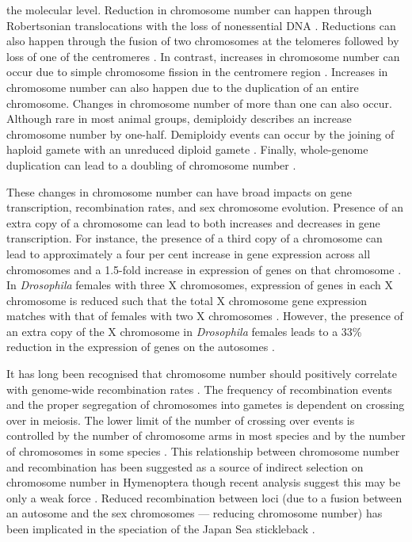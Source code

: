 \documentclass[]{rsos}%
\begin{document}
\maketitle

the molecular level.
Reduction in chromosome number can happen through Robertsonian translocations with the loss of nonessential DNA \cite{garagna1995}.
Reductions can also happen through the fusion of two chromosomes at the telomeres followed by loss of one of the centromeres \cite{gordon2011mechanisms, miga2016}.
In contrast, increases in chromosome number can occur due to simple chromosome fission in the centromere region \cite{moretti1984}.
Increases in chromosome number can also happen due to the duplication of an entire chromosome.
Changes in chromosome number of more than one can also occur.
Although rare in most animal groups, demiploidy describes an increase chromosome number by one-half. 
Demiploidy events can occur by the joining of haploid gamete with an unreduced diploid gamete \cite{hornsey1973}.
Finally, whole-genome duplication can lead to a doubling of chromosome number \cite{beccak1970}.

These changes in chromosome number can have broad impacts on gene transcription, recombination rates, and sex chromosome evolution.
Presence of an extra copy of a chromosome can lead to both increases and decreases in gene transcription.  
For instance, the presence of a third copy of a chromosome can lead to approximately a four per cent increase in gene expression across all chromosomes and a 1.5-fold increase in expression of genes on that chromosome \cite{lockstone2007, williams2008aneuploidy}.
In \textit{Drosophila} females with three X chromosomes, expression of genes in each X chromosome is reduced such that the total X chromosome gene expression matches with that of females with two X chromosomes \cite{sun2013dosage}.
However, the presence of an extra copy of the X chromosome in \textit{Drosophila} females leads to a 33\% reduction in the expression of genes on the autosomes \cite{sun2013dosage}. 

It has long been recognised that chromosome number should positively correlate with genome-wide recombination rates \cite{stebbins1958}.
The frequency of recombination events and the proper segregation of chromosomes into gametes is dependent on crossing over in meiosis.
The lower limit of the number of crossing over events is controlled by the number of chromosome arms in most species and by the number of chromosomes in some species \cite{dumont2017req}.
This relationship between chromosome number and recombination has been suggested as a source of indirect selection on chromosome number in Hymenoptera though recent analysis suggest this may be only a weak force \cite{ross2015, sherman1979}.
Reduced recombination between loci (due to a fusion between an autosome and the sex chromosomes --- reducing chromosome number) has been implicated in the speciation of the Japan Sea stickleback \cite{kitano2012}. 
\end{document}
